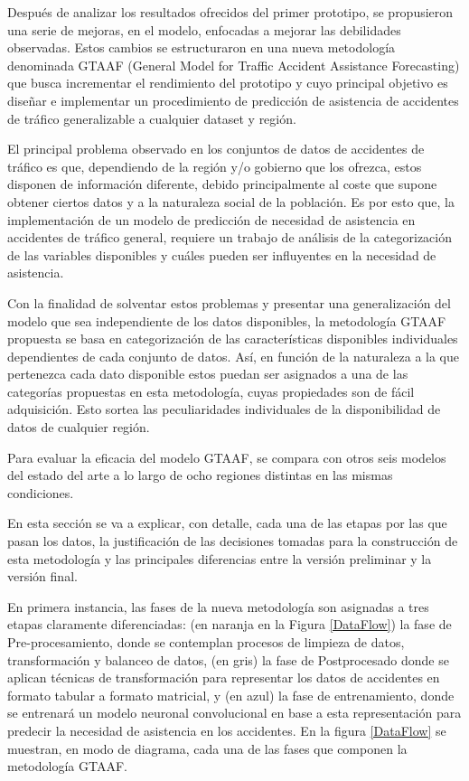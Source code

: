 \documentclass{uathesis-es}
\begin{document}
	Después de analizar los resultados ofrecidos del primer prototipo, se propusieron una serie de mejoras, en el modelo, enfocadas a mejorar las debilidades observadas. Estos cambios se estructuraron en una nueva metodología denominada GTAAF (General Model for Traffic Accident Assistance Forecasting) que busca incrementar el rendimiento del prototipo y cuyo principal objetivo es diseñar e implementar un procedimiento de predicción de asistencia de accidentes de tráfico generalizable a cualquier dataset y región. 
	
	El principal problema observado en los conjuntos de datos de accidentes de tráfico es que, dependiendo de la región y/o gobierno que los ofrezca, estos disponen de información diferente, debido principalmente al coste que supone obtener ciertos datos y a la naturaleza social de la población. Es por esto que, la implementación de un modelo de predicción de necesidad de asistencia en accidentes de tráfico general, requiere un trabajo de análisis de la categorización de las variables disponibles y cuáles pueden ser influyentes en la necesidad de asistencia.
	
	Con la finalidad de solventar estos problemas y presentar una generalización del modelo que sea independiente de los datos disponibles, la metodología GTAAF propuesta se basa en categorización de las características disponibles individuales dependientes de cada conjunto de datos. Así, en función de la naturaleza a la que pertenezca cada dato disponible estos puedan ser asignados a una de las categorías propuestas en esta metodología, cuyas propiedades son de fácil adquisición. Esto sortea las peculiaridades individuales de la disponibilidad de datos de cualquier región. 
	
	Para evaluar la eficacia del modelo GTAAF, se compara con otros seis modelos del estado del arte a lo largo de ocho regiones distintas en las mismas condiciones.
	
	En esta sección se va a explicar, con detalle, cada una de las etapas por las que pasan los datos, la justificación de las decisiones tomadas para la construcción de esta metodología y las principales diferencias entre la versión preliminar y la versión final.
	
	En primera instancia, las fases de la nueva metodología son asignadas a tres etapas claramente diferenciadas: (en naranja en la Figura \ref{DataFlow}) la fase de Pre-procesamiento, donde se contemplan procesos de limpieza de datos, transformación y balanceo de datos, (en gris) la fase de Postprocesado donde se aplican técnicas de transformación para representar los datos de accidentes en formato tabular a formato matricial, y (en azul) la fase de entrenamiento, donde se entrenará un modelo neuronal convolucional en base a esta representación para predecir la necesidad de asistencia en los accidentes. En la figura \ref{DataFlow} se muestran, en modo de diagrama, cada una de las fases que componen la metodología GTAAF.
	
\end{document}

